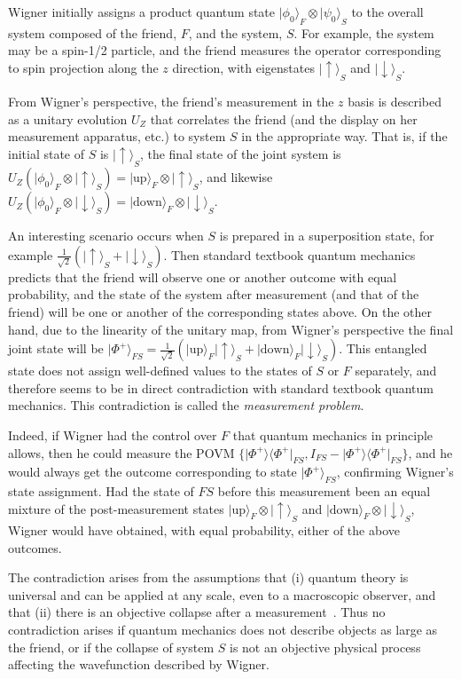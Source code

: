 \documentclass[aps,prx,twocolumn,superscriptaddress]{revtex4-1}
\theoremstyle{plain}
\newcommand{\ket}[1]{\ensuremath{|{#1}\rangle}}
\newcommand{\bra}[1]{\ensuremath{\langle{#1}|}}
\begin{document}
Wigner initially assigns a product quantum state $\ket{\phi_0}_F \otimes \ket{\psi_0}_{S}$  to the overall system composed of the friend, $F$, and the system, $S$. For example, the system may be a spin-1/2 particle, and the friend measures the operator corresponding to spin projection along the $z$ direction, with eigenstates $\ket{\uparrow}_S$ and $\ket{\downarrow}_S$.

From Wigner's perspective, the friend's measurement in the $z$ basis is described as a unitary evolution $U_{Z}$ that correlates the friend (and the display on her measurement apparatus, etc.) to system $S$ in the appropriate way. That is, if the initial state of $S$ is $\ket{\uparrow}_S$, the final state of the joint system is $U_Z(\ket{\phi_0}_F \otimes \ket{\uparrow}_S) = \ket{\mathrm{up}}_F \otimes \ket{\uparrow}_S$, and likewise $U_Z(\ket{\phi_0}_F \otimes \ket{\downarrow}_S) = \ket{\mathrm{down}}_F \otimes \ket{\downarrow}_S$.

An interesting scenario occurs when $S$ is prepared in a superposition state, for example $\frac{1}{\sqrt{2}}(\ket{\uparrow}_S+\ket{\downarrow}_S)$. Then standard textbook quantum mechanics predicts that the friend will observe one or another outcome with equal probability, and the state of the system after measurement (and that of the friend) will be one or another of the corresponding states above. On the other hand, due to the linearity of the unitary map, from Wigner's perspective the final joint state will be $\ket{\Phi^+}_{FS} = \frac{1}{\sqrt{2}}(\ket{\mathrm{up}}_F\ket{\uparrow}_S+\ket{\mathrm{down}}_F\ket{\downarrow}_S)$. This entangled state does not assign well-defined values to the states of $S$ or $F$ separately, and therefore seems to be in direct contradiction with standard textbook quantum mechanics. This contradiction is called the \emph{measurement problem}.

Indeed, if Wigner had the control over $F$ that quantum mechanics in principle allows, then he could measure the POVM $\{\ket{\Phi^+}\bra{\Phi^+}_{FS}, I_{FS} - \ket{\Phi^+}\bra{\Phi^+}_{FS}\}$, and he would always get the outcome corresponding to state $\ket{\Phi^+}_{FS}$, confirming Wigner's state assignment. Had the state of $FS$ before this measurement been an equal mixture of the post-measurement states $\ket{\mathrm{up}}_F \otimes \ket{\uparrow}_S$ and $\ket{\mathrm{down}}_F \otimes \ket{\downarrow}_S$, Wigner would have obtained, with equal probability, either of the above outcomes.

The contradiction arises from the assumptions that (i) quantum theory is universal and can be applied at any scale, even to a macroscopic observer, and that (ii) there is an objective collapse after a measurement~\cite{Formalisms}. Thus no contradiction arises if quantum mechanics does not describe objects as large as the friend, or if the collapse of system $S$ is not an objective physical process affecting the wavefunction described by Wigner.
\end{document}
